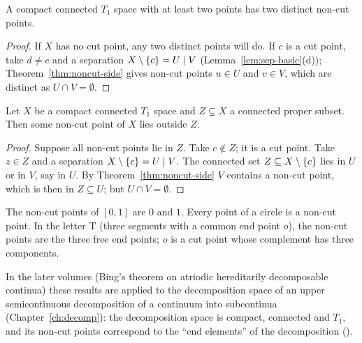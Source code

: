 
\begin{theorem}\label{thm:two-noncut}
A compact connected $T_1$ space with at least two points has two distinct non-cut points.
\end{theorem}

\begin{proof}
If $X$ has no cut point, any two distinct points will do. If $c$ is a cut point, take $d\ne c$ and a
separation $X\setminus\left\{ c \right\}=U\mid V$ (Lemma~\ref{lem:sep-basic}(d)); Theorem~\ref{thm:noncut-side}
gives non-cut points $u\in U$ and $v\in V$, which are distinct as $U\cap V=\emptyset$.
\end{proof}


\begin{theorem}\label{thm:noncut-not-in}
Let $X$ be a compact connected $T_1$ space and $Z\subsetneq X$ a connected proper subset. Then some
non-cut point of $X$ lies outside $Z$.
\end{theorem}

\begin{proof}
Suppose all non-cut points lie in $Z$. Take $c\notin Z$; it is a cut point. Take $z\in Z$ and a
separation $X\setminus\left\{ c \right\}=U\mid V$. The connected set $Z\subseteq X\setminus\left\{ c \right\}$ lies in $U$ or in
$V$, say in $U$. By Theorem~\ref{thm:noncut-side} $V$ contains a non-cut point, which is then in
$Z\subseteq U$; but $U\cap V=\emptyset$.
\end{proof}


\begin{example}
The non-cut points of $[0,1]$ are $0$ and $1$. Every point of a circle is a non-cut point. In the
letter T (three segments with a common end point $o$), the non-cut points are the three free end
points; $o$ is a cut point whose complement has three components.
\end{example}

\begin{remark}\label{rem:noncut-use}
In the later volumes (Bing's theorem on atriodic hereditarily decomposable continua) these
results are applied to the decomposition space of an upper semicontinuous decomposition of a
continuum into subcontinua (Chapter~\ref{ch:decomp}): the decomposition space is compact,
connected and $T_1$, and its non-cut points correspond to the ``end elements'' of the
decomposition ().
\end{remark}

